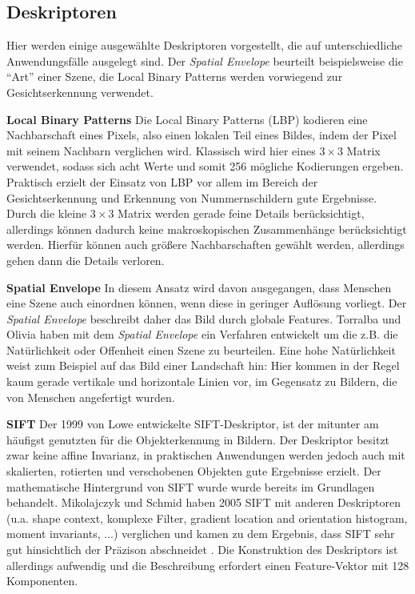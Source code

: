 \subsection{Deskriptoren}

Hier werden einige ausgewählte Deskriptoren vorgestellt, die auf unterschiedliche Anwendungsfälle ausgelegt sind. Der \textit{Spatial Envelope} beurteilt beispielsweise die \enquote{Art} einer Szene, die Local Binary Patterns werden vorwiegend zur Gesichtserkennung verwendet. \newline

\textbf{Local Binary Patterns} Die Local Binary Patterns (LBP) kodieren eine Nachbarschaft eines Pixels, also einen lokalen Teil eines Bildes, indem der Pixel mit seinem Nachbarn verglichen wird. Klassisch wird hier eines $3 \times 3$ Matrix verwendet, sodass sich acht Werte und somit 256 mögliche Kodierungen ergeben.
Praktisch erzielt der Einsatz von LBP vor allem im Bereich der Gesichtserkennung und Erkennung von Nummernschildern gute Ergebnisse. Durch die kleine $3 \times 3$ Matrix werden gerade feine Details berücksichtigt, allerdings können dadurch keine makroskopischen Zusammenhänge berücksichtigt werden. Hierfür können auch größere Nachbarschaften gewählt werden, allerdings gehen dann die Details verloren.\newline 

\textbf{Spatial Envelope} In diesem Ansatz wird davon ausgegangen, dass Menschen eine Szene auch einordnen können, wenn diese in geringer Auflösung vorliegt. Der \textit{Spatial Envelope} beschreibt daher das Bild durch globale Features. Torralba und Olivia \cite{mts2001} haben mit dem  \textit{Spatial Envelope} ein Verfahren entwickelt um die z.B. die Natürlichkeit oder Offenheit einen Szene zu beurteilen. Eine hohe Natürlichkeit weist zum Beispiel auf das Bild einer Landschaft hin: Hier kommen in der Regel kaum gerade vertikale und horizontale Linien vor, im Gegensatz zu Bildern, die von Menschen angefertigt wurden.\newline

\textbf{SIFT} Der 1999 von Lowe entwickelte SIFT-Deskriptor, ist der mitunter am häufigst genutzten für die Objekterkennung in Bildern. Der Deskriptor besitzt zwar keine affine Invarianz, in praktischen Anwendungen werden jedoch auch mit skalierten, rotierten und verschobenen Objekten gute Ergebnisse erzielt.
Der mathematische Hintergrund von SIFT wurde wurde bereits im Grundlagen behandelt. Mikolajczyk und Schmid haben 2005 SIFT mit anderen Deskriptoren (u.a. shape context, komplexe Filter, gradient location and orientation histogram, moment invariants, ...) verglichen und kamen zu dem Ergebnis, dass SIFT sehr gut hinsichtlich der Präzison abschneidet \cite{idp2005}. Die Konstruktion des Deskriptors ist allerdings aufwendig und die Beschreibung erfordert einen Feature-Vektor mit 128 Komponenten.\newline

